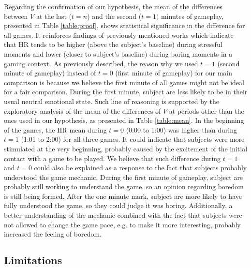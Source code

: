 Regarding the confirmation of our hypothesis, the mean of the differences between $V$ at the last ($t=n$) and the second ($t=1)$ minutes of gameplay, presented in Table \ref{table:proof}, shows statistical significance in the difference for all games. It reinforces findings of previously mentioned works \parencite{vandeput2009heart, garde2002effects, bousefsaf2013remote, rodriguez2015vr, yamakoshi2007preliminary} which indicate that HR tends to be higher (above the subject's baseline) during stressful moments and lower (closer to subject's baseline) during boring moments in a gaming context. As previously described, the reason why we used $t=1$ (second minute of gameplay) instead of $t=0$ (first minute of gameplay) for our main comparison is because we believe the first minute of all games might not be ideal for a fair comparison. During the first minute, subject are less likely to be in their usual neutral emotional state. Such line of reasoning is supported by the exploratory analysis of the mean of the differences of $V$ at periods other than the ones used in our hypothesis, as presented in Table \ref{table:mean}. In the beginning of the games, the HR mean during $t=0$ (0:00 to 1:00) was higher than during $t=1$ (1:01 to 2:00) for all three games. It could indicate that subjects were more stimulated at the very beginning, probably caused by the excitement of the initial contact with a game to be played. We believe that such difference during $t=1$ and $t=0$ could also be explained as a response to the fact that subjects probably understood the game mechanic. During the first minute of gameplay, subject are probably still working to understand the game, so an opinion regarding boredom is still being formed. After the one minute mark, subject are more likely to have fully understood the game, so they could judge it was boring. Additionally, a better understanding of the mechanic combined with the fact that subjects were not allowed to change the game pace, e.g. to make it more interesting, probably increased the feeling of boredom.

\subsection{Limitations}

